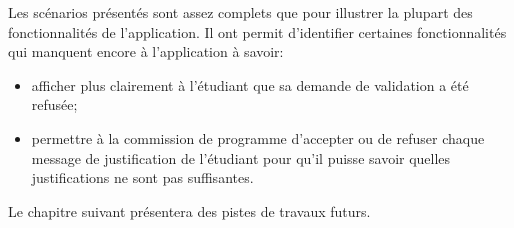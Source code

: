 Les scénarios présentés sont assez complets que pour illustrer la plupart des fonctionnalités de l'application. Il ont permit d'identifier certaines fonctionnalités qui manquent encore à l'application à savoir:
\begin{itemize}
\item afficher plus clairement à l'étudiant que sa demande de validation a été refusée;
\item permettre à la commission de programme d'accepter ou de refuser chaque message de justification de l'étudiant pour qu'il puisse savoir quelles justifications ne sont pas suffisantes.
\end{itemize}

Le chapitre suivant présentera des pistes de travaux futurs. 